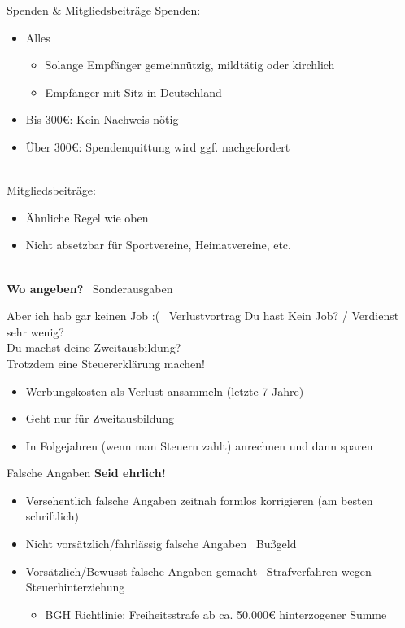 \documentclass{beamer}
\newcommand{\n}{\hfill\\\vspace{0.25cm}}
\begin{document}
			\begin{frame}{Spenden \& Mitgliedsbeiträge}
				Spenden:
				\begin{itemize}
					\item Alles
					\begin{itemize}
						\item Solange Empfänger gemeinnützig, mildtätig oder kirchlich
						\item Empfänger mit Sitz in Deutschland
					\end{itemize}
					\item Bis 300€: Kein Nachweis nötig
					\item Über 300€: Spendenquittung wird ggf. nachgefordert
				\end{itemize}\n
				Mitgliedsbeiträge:
				\begin{itemize}
					\item Ähnliche Regel wie oben
					\item Nicht absetzbar für Sportvereine, Heimatvereine, etc.
				\end{itemize}\n
				\textbf{Wo angeben?} \textrightarrow\ Sonderausgaben
			\end{frame}
		
			\begin{frame}{Aber ich hab gar keinen Job :( \textrightarrow\ Verlustvortrag}
				Du hast Kein Job? / Verdienst sehr wenig?\\\pause
				Du machst deine Zweitausbildung?\\\pause
				Trotzdem eine Steuererklärung machen!\n\pause
				\begin{itemize}
					\item Werbungskosten als Verlust ansammeln (letzte 7 Jahre)
					\item Geht nur für Zweitausbildung
					\item In Folgejahren (wenn man Steuern zahlt) anrechnen und dann sparen
				\end{itemize}
			\end{frame}
		
			\begin{frame}{Falsche Angaben}
				\textbf{Seid ehrlich!}\n
				\begin{itemize}
					\item Versehentlich falsche Angaben zeitnah formlos korrigieren (am besten schriftlich)
					\item Nicht vorsätzlich/fahrlässig falsche Angaben \textrightarrow\ Bußgeld
					\item Vorsätzlich/Bewusst falsche Angaben gemacht \textrightarrow\ Strafverfahren wegen Steuerhinterziehung
					\begin{itemize}
						\item BGH Richtlinie: Freiheitsstrafe ab ca. 50.000€ hinterzogener Summe
					\end{itemize}
				\end{itemize}
			\end{frame}
		
\end{document}
